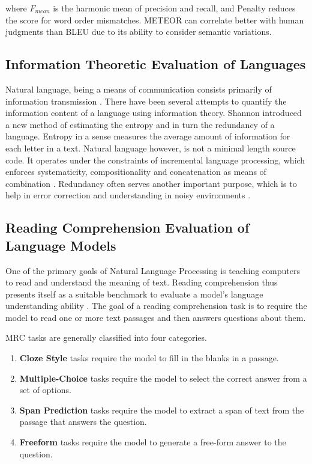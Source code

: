 where $ F_{mean} $ is the harmonic mean of precision and recall, and $\text{Penalty}$ reduces the score for word order mismatches. METEOR can correlate better with human judgments than BLEU 
due to its ability to consider semantic variations.


\subsection{Information Theoretic Evaluation of Languages}
Natural language, being a means of communication consists primarily of information transmission \cite{debowskiInformationTheoryLanguage2020}. There have
been several attempts to quantify the information content of a language using information theory. Shannon \cite{shannonPredictionEntropyPrinted1951} introduced a new
method of estimating the entropy and in turn the redundancy of a language. Entropy in a sense measures the average amount of information for each letter in a text.
Natural language however, is not a minimal length source code. It operates under the constraints of incremental language processing, which enforces
systematicity, compositionality and concatenation as means of combination  \cite{futrellInformationTheoryBridge2022}. Redundancy often serves another
important purpose, which is to help in error correction and understanding in noisy environments \cite{gibsonHowEfficiencyShapes2019}.

\subsection{Reading Comprehension Evaluation of Language Models}
One of the primary goals of Natural Language Processing is teaching computers to read and understand the meaning of text. Reading comprehension 
thus presents itself as a suitable benchmark to evaluate a model's language understanding ability \cite{zengSurveyMachineReading2020}.  The goal 
of a reading comprehension task is to require the model to read one or more text passages and then answers questions about them. 

MRC tasks are generally classified into four categories. 
\begin{enumerate}
    \item \textbf{Cloze Style} tasks require the model to fill in the blanks in a passage. 
    \item \textbf{Multiple-Choice} tasks require the model to select the correct answer from a set of options.
    \item \textbf{Span Prediction} tasks require the model to extract a span of text from the passage that answers the question.
    \item \textbf{Freeform} tasks require the model to generate a free-form answer to the question.
\end{enumerate}

